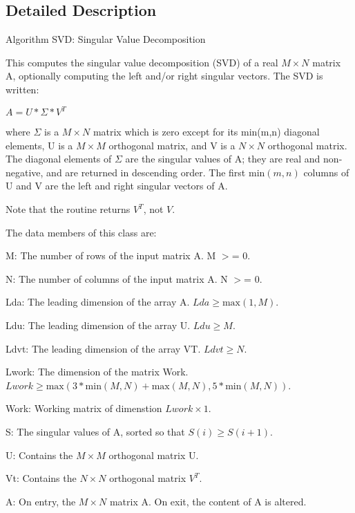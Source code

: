\subsection{Detailed Description}
Algorithm S\+V\+D\+: Singular Value Decomposition

This computes the singular value decomposition (S\+V\+D) of a real $ M \times N $ matrix A, optionally computing the left and/or right singular vectors. The S\+V\+D is written\+:

$ A = U * \Sigma * V^{T} $

where $ \Sigma $ is a $ M \times N $ matrix which is zero except for its min(m,n) diagonal elements, U is a $ M \times M $ orthogonal matrix, and V is a $ N \times N $ orthogonal matrix. The diagonal elements of $ \Sigma $ are the singular values of A; they are real and non-\/negative, and are returned in descending order. The first $ \mbox{min}(m,n) $ columns of U and V are the left and right singular vectors of A.

Note that the routine returns $ V^{T} $, not $ V $.

The data members of this class are\+:


\begin{DoxyItemize}
\item M\+: The number of rows of the input matrix A. M $>$= 0.
\item N\+: The number of columns of the input matrix A. N $>$= 0.
\item Lda\+: The leading dimension of the array A. $ Lda \geq \mbox{max}(1,M) $.
\item Ldu\+: The leading dimension of the array U. $ Ldu \geq M $.
\item Ldvt\+: The leading dimension of the array V\+T. $ Ldvt \geq N $.
\item Lwork\+: The dimension of the matrix Work. $ Lwork \geq \mbox{max}(3 * \mbox{min}(M,N) + \mbox{max}(M,N), 5 * \mbox{min}(M,N)) $.
\item Work\+: Working matrix of dimenstion $ Lwork \times 1 $.
\item S\+: The singular values of A, sorted so that $ S(i) \geq S(i+1) $.
\item U\+: Contains the $ M \times M $ orthogonal matrix U.
\item Vt\+: Contains the $ N \times N $ orthogonal matrix $ V^{T} $.
\item A\+: On entry, the $ M \times N $ matrix A. On exit, the content of A is altered.
\end{DoxyItemize}

